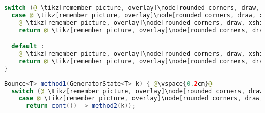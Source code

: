 \begin{center}
\begin{mdframed}[topline=true]
\begin{minipage}[t]{0.4\textwidth}
\begin{lstlisting}[language=Java, numbers=none, breaklines=true]
switch (@ \tikz[remember picture, overlay]\node[rounded corners, draw, xshift=-0.1cm, inner sep=5pt, anchor=west, yshift=0.1cm] {Szelektor}; \vspace*{0.3cm} \hspace*{1.35cm}@) {
  case @ \tikz[remember picture, overlay]\node[rounded corners, draw, xshift=-0.1cm, inner sep=5pt, anchor=west, yshift=0.1cm] {Konstans}; \vspace*{0.3cm} \hspace*{1.35cm}@:
    @ \tikz[remember picture, overlay]\node[rounded corners, draw, xshift=-0.1cm, inner sep=5pt, anchor=west] {Kódrészlet \#1}; \vspace*{0.5cm} @ 
    return @ \tikz[remember picture, overlay]\node[rounded corners, draw, xshift=-0.1cm, inner sep=5pt, anchor=west, yshift=0.1cm] {Kifejezés \#1}; \vspace*{0.3cm} @

  default :
    @ \tikz[remember picture, overlay]\node[rounded corners, draw, xshift=-0.1cm, inner sep=5pt, anchor=west] {Kódrészlet \#2}; \vspace*{0.5cm} @ 
    return @ \tikz[remember picture, overlay]\node[rounded corners, draw, xshift=-0.1cm, inner sep=5pt, anchor=west, yshift=0.1cm] {Kifejezés \#2}; \vspace*{0.3cm} @
}
\end{lstlisting}
\end{minipage} 
\begin{minipage}[t]{0.6\textwidth}
\begin{lstlisting}[language=Java, numbers=none, breaklines=true]
Bounce<T> method1(GeneratorState<T> k) { @\vspace{0.2cm}@
  switch (@ \tikz[remember picture, overlay]\node[rounded corners, draw, xshift=-0.1cm, inner sep=5pt, anchor=west, yshift=0.1cm] {Szelektor}; \vspace*{0.3cm} \hspace*{1.35cm}@) {
    case @ \tikz[remember picture, overlay]\node[rounded corners, draw, xshift=-0.1cm, inner sep=5pt, anchor=west, yshift=0.1cm] {Konstans}; \vspace*{0.1cm} \hspace*{1.35cm}@:
      return cont(() -> method2(k));


\end{lstlisting}
\end{minipage}
\end{mdframed}
\end{center}

